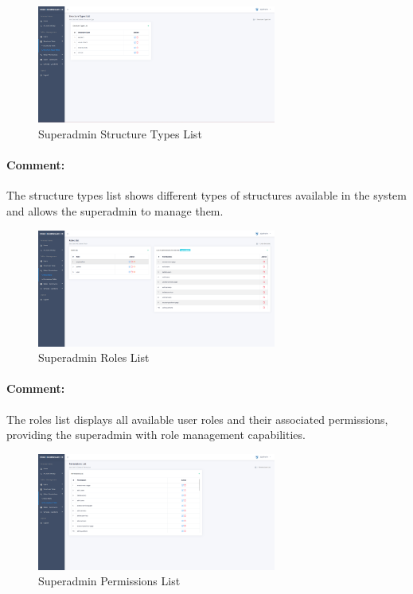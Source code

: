 \begin{itemize}
\begin{figure}[htbp]
  \centering
  \includegraphics[width=0.7\textwidth]{SCREENSHOTS/superadmin/structureTypes_list.png}
  \caption{Superadmin Structure Types List}
  \label{fig:structure-types-list}
\end{figure}
\paragraph{Comment:} The structure types list shows different types of structures available in the system and allows the superadmin to manage them.

\begin{figure}[htbp]
  \centering
  \includegraphics[width=0.7\textwidth]{SCREENSHOTS/superadmin/roles_list.png}
  \caption{Superadmin Roles List}
  \label{fig:roles-list}
\end{figure}
\paragraph{Comment:} The roles list displays all available user roles and their associated permissions, providing the superadmin with role management capabilities.
\newpage



\begin{figure}[htbp]
    \centering
    \includegraphics[width=0.7\textwidth]{SCREENSHOTS/superadmin/permissions_list.png}
    \caption{Superadmin Permissions List}
    \label{fig:permissions-list}
  \end{figure}

\end{itemize}

